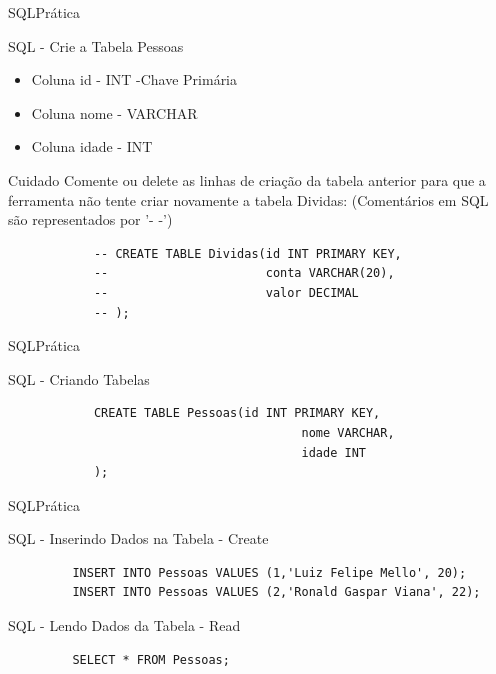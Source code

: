 \documentclass{beamer}
\begin{document}
\begin{frame}[fragile]{SQL}{Prática}
	\begin{block} {SQL - Crie a Tabela Pessoas}
		\begin{itemize}
			\item Coluna id - INT -Chave Primária
			\item Coluna nome - VARCHAR
			\item Coluna idade - INT
		\end{itemize}
	\end{block}
	\begin{block}{Cuidado}
		Comente ou delete as linhas de criação da tabela anterior para que a ferramenta não tente criar novamente a tabela Dividas: (Comentários em SQL são representados por '- -')
		\begin{verbatim}
		    -- CREATE TABLE Dividas(id INT PRIMARY KEY, 
		    --                      conta VARCHAR(20),
		    --                      valor DECIMAL
		    -- );
		\end{verbatim}
	\end{block}
\end{frame}

\begin{frame}[fragile]{SQL}{Prática}
	\begin{block} {SQL - Criando Tabelas}
		\begin{verbatim}
		    CREATE TABLE Pessoas(id INT PRIMARY KEY, 
		    		                     nome VARCHAR, 
		    		                     idade INT
		    );
		\end{verbatim}
	\end{block}
\end{frame}

\begin{frame}[fragile]{SQL}{Prática}
	\begin{block} {SQL - Inserindo Dados na Tabela - Create}
		\begin{verbatim}
		 INSERT INTO Pessoas VALUES (1,'Luiz Felipe Mello', 20);
		 INSERT INTO Pessoas VALUES (2,'Ronald Gaspar Viana', 22);
		\end{verbatim}
	\end{block}
	\vline
	\begin{block} {SQL - Lendo Dados da Tabela - Read}
		\begin{verbatim}
		 SELECT * FROM Pessoas;
		\end{verbatim}
	\end{block}
\end{frame}
\end{document}
